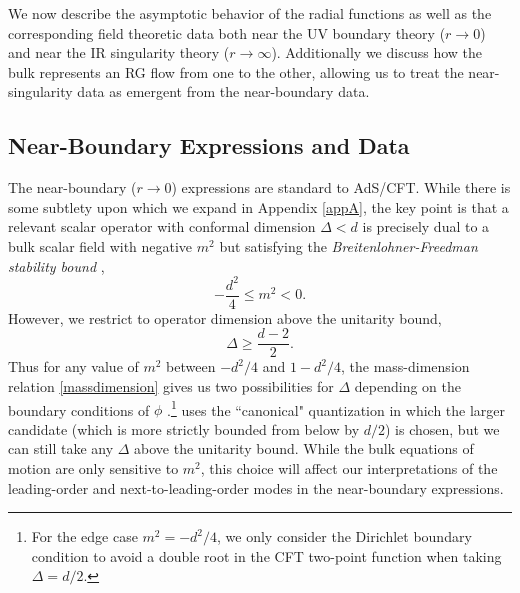 \documentclass[12pt,a4paper]{article}
\begin{document}
We now describe the asymptotic behavior of the radial functions as well as the corresponding field theoretic data both near the UV boundary theory ($r \to 0$) and near the IR singularity theory ($r \to \infty$). Additionally we discuss how the bulk represents an RG flow from one to the other, allowing us to treat the near-singularity data as emergent from the near-boundary data.

\subsection{Near-Boundary Expressions and Data}\label{sec2.1}

The near-boundary ($r \to 0$) expressions are standard to AdS/CFT. While there is some subtlety upon which we expand in Appendix \ref{appA}, the key point is that a relevant scalar operator with conformal dimension $\Delta < d$ is precisely dual to a bulk scalar field with negative $m^2$ but satisfying the \textit{Breitenlohner-Freedman stability bound} \cite{Breitenlohner:1982bm},
\begin{equation}
-\frac{d^2}{4} \leq m^2 < 0.
\end{equation}
However, we restrict to operator dimension above the unitarity bound,
\begin{equation}
\Delta \geq \frac{d-2}{2}.
\end{equation}
Thus for any value of $m^2$ between $-d^2/4$ and $1-d^2/4$, the mass-dimension relation \eqref{massdimension} gives us two possibilities for $\Delta$ depending on the boundary conditions of $\phi$ \cite{Klebanov:1999tb,Minces:1999eg}.\footnote{For the edge case $m^2 = -d^2/4$, we only consider the Dirichlet boundary condition to avoid a double root in the CFT two-point function when taking $\Delta = d/2$.} \cite{Frenkel:2020ysx} uses the ``canonical" quantization in which the larger candidate (which is more strictly bounded from below by $d/2$) is chosen, but we can still take any $\Delta$ above the unitarity bound. While the bulk equations of motion are only sensitive to $m^2$, this choice will affect our interpretations of the leading-order and next-to-leading-order modes in the near-boundary expressions.
\end{document}
